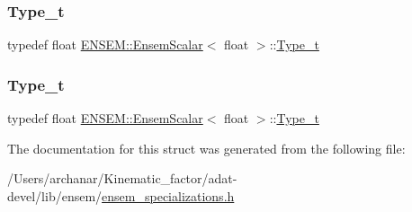 \subsubsection{\texorpdfstring{Type\_t}{Type\_t}\hspace{0.1cm}{\footnotesize\ttfamily [2/3]}}
{\footnotesize\ttfamily typedef float \mbox{\hyperlink{structENSEM_1_1EnsemScalar}{E\+N\+S\+E\+M\+::\+Ensem\+Scalar}}$<$ float $>$\+::\mbox{\hyperlink{structENSEM_1_1EnsemScalar_3_01float_01_4_a908908baf5b54ef6561962c858fb7183}{Type\+\_\+t}}}

\mbox{\label{structENSEM_1_1EnsemScalar_3_01float_01_4_a908908baf5b54ef6561962c858fb7183}} 
\subsubsection{\texorpdfstring{Type\_t}{Type\_t}\hspace{0.1cm}{\footnotesize\ttfamily [3/3]}}
{\footnotesize\ttfamily typedef float \mbox{\hyperlink{structENSEM_1_1EnsemScalar}{E\+N\+S\+E\+M\+::\+Ensem\+Scalar}}$<$ float $>$\+::\mbox{\hyperlink{structENSEM_1_1EnsemScalar_3_01float_01_4_a908908baf5b54ef6561962c858fb7183}{Type\+\_\+t}}}



The documentation for this struct was generated from the following file\+:\begin{DoxyCompactItemize}
\item 
/\+Users/archanar/\+Kinematic\+\_\+factor/adat-\/devel/lib/ensem/\mbox{\hyperlink{adat-devel_2lib_2ensem_2ensem__specializations_8h}{ensem\+\_\+specializations.\+h}}\end{DoxyCompactItemize}
